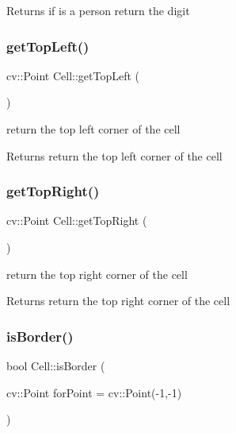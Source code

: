 \begin{DoxyReturn}{Returns}
if is a person return the digit 
\end{DoxyReturn}
\mbox{\label{class_cell_ac6e9338748b2098e034641c88a977b23}} 
\subsubsection{\texorpdfstring{get\+Top\+Left()}{getTopLeft()}}
{\footnotesize\ttfamily cv\+::\+Point Cell\+::get\+Top\+Left (\begin{DoxyParamCaption}{ }\end{DoxyParamCaption})}

return the top left corner of the cell \begin{DoxyReturn}{Returns}
return the top left corner of the cell 
\end{DoxyReturn}
\mbox{\label{class_cell_a4b08bffc22a4393fd86c9608d9723d7c}} 
\subsubsection{\texorpdfstring{get\+Top\+Right()}{getTopRight()}}
{\footnotesize\ttfamily cv\+::\+Point Cell\+::get\+Top\+Right (\begin{DoxyParamCaption}{ }\end{DoxyParamCaption})}

return the top right corner of the cell \begin{DoxyReturn}{Returns}
return the top right corner of the cell 
\end{DoxyReturn}
\mbox{\label{class_cell_adebbc4bba0795d564ec275ea32edb525}} 
\subsubsection{\texorpdfstring{is\+Border()}{isBorder()}}
{\footnotesize\ttfamily bool Cell\+::is\+Border (\begin{DoxyParamCaption}\item[{cv\+::\+Point}]{for\+Point = {\ttfamily cv\+:\+:Point(-\/1,-\/1)} }\end{DoxyParamCaption})}

